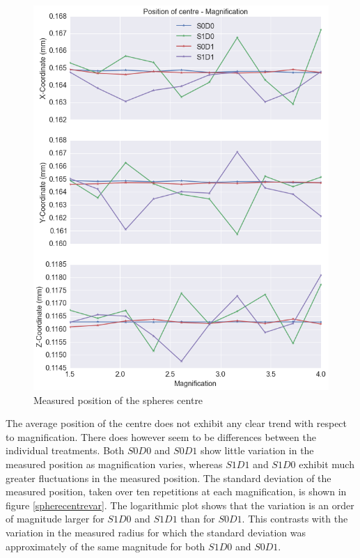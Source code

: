 \documentclass[
  twoside,
  11pt, a4paper,
  footinclude=true,
  headinclude=true,
  cleardoublepage=empty
]{scrbook}
\begin{document}
\begin{figure}[h!]
  \centering
    \includegraphics[width=\textwidth]{code/RadiusMeasurements/Plots_RadiusCentre_files/Plots_RadiusCentre_6_0.png}
    \caption{Measured position of the spheres centre}
        \label{spherecentre}
\end{figure}

The average position of the centre does not exhibit any clear trend with respect to magnification. There does however seem to be differences between the individual treatments. Both $S0D0$ and $S0D1$ show little variation in the measured position as magnification varies, whereas $S1D1$ and $S1D0$ exhibit much greater fluctuations in the measured position. The standard deviation of the measured position, taken over ten repetitions at each magnification, is shown in figure \ref{spherecentrevar}. The logarithmic plot shows that the variation is an order of magnitude larger for $S1D0$ and $S1D1$ than for $S0D1$. This contrasts with the variation in the measured radius for which the standard deviation was approximately of the same magnitude for both $S1D0$ and $S0D1$.
\end{document}
